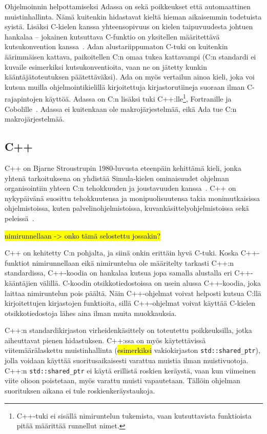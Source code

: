 Ohjelmoinnin helpottamiseksi Adassa on sekä poikkeukset että automaattinen
muistinhallinta. Nämä kuitenkin hidastavat kieltä hieman aikaisemmin todetuista
syistä. Lisäksi C-kielen kanssa yhteensopivuus on kielen taipuvuudesta johtuen
hankalaa -- jokainen kutsuttava C-funktio on yksitellen määritettävä
kutsukonvention kanssa~\citep[s.~471]{ADA12}. Adan
alustariippumaton C-tuki on kuitenkin äärimmäisen kattava, paikoitellen C:n
omaa tukea kattavampi (C:n standardi ei kuvaile esimerkiksi kutsukonventioita,
vaan ne on jätetty kunkin kääntäjätoteutuksen päätettäväksi). Ada on myös
vertailun ainoa kieli, joka voi kutsua muilla ohjelmointikielillä kirjoitettuja
kirjastorutiineja suoraan ilman C-rajapintojen käyttöä. Adassa on C:n lisäksi
tuki C++:lle\footnote{C++-tuki ei sisällä nimiruntelun tukemista, vaan
kutsuttavista funktioista pitää määrittää runnellut nimet.}, Fortranille ja
Cobolille~\citep[s.~585]{ADA12}. Adassa ei kuitenkaan ole makrojärjestelmää,
eikä Ada tue C:n makrojärjestelmää.

\subsection{C++}

C++ on Bjarne Stroustrupin 1980-luvusta eteenpäin kehittämä kieli, jonka
yhtenä tarkoituksena on yhdistää Simula-kielen ominaisuudet ohjelman
organisointiin yhteen C:n tehokkuuden ja joustavuuden
kanssa~\citep{cpphistory}. C++ on nykypäivänä suosittu tehokkuutensa ja
monipuolisuutensa takia monimutkaisissa ohjelmistoissa, kuten
palvelinohjelmistoissa, kuvankäsittelyohjelmistoissa sekä
peleissä~\citep{cppapps}.

\hl{nimirunnellaan -> onko tämä selostettu jossakin?}

C++ on kehitetty C:n pohjalta, ja siinä onkin erittäin hyvä C-tuki. Koska
C++\hyp{}funktiot nimirunnellaan eikä nimiruntelua ole määritelty tarkasti C++:n
standardissa, C++-koodia on hankalaa kutsua jopa samalla alustalla eri
C++-kääntäjien välillä. C-koodin otsikkotiedostoissa on
usein alussa C++-koodia, joka laittaa nimiruntelun pois päältä. Näin
C++-ohjelmat voivat helposti kutsua C:llä kirjoitettujen kirjastojen
funktioita, sillä C++-ohjelmat voivat käyttää C-kielen otsikkotiedostoja lähes
aina ilman muita muokkauksia.

C++:n standardikirjaston virheidenkäsittely on toteutettu poikkeuksilla, jotka
aiheuttavat pienen hidastuksen. C++:ssa on myös käytettävissä
viitemäärälaskettu muistinhallinta (\hl{esimerkiksi} vakiokirjaston
\texttt{std::shared\_ptr}), jolla voidaan käyttää suoritusaikaisesti varattua
muistia ilman muistivuotoja. C++:n \texttt{std::shared\_ptr} ei käytä erillistä
roskien keräystä, vaan kun viimeinen viite olioon poistetaan, myös varattu
muisti vapautetaan. Tällöin ohjelman suorituksen aikana ei tule
roskienkeräystaukoja.

